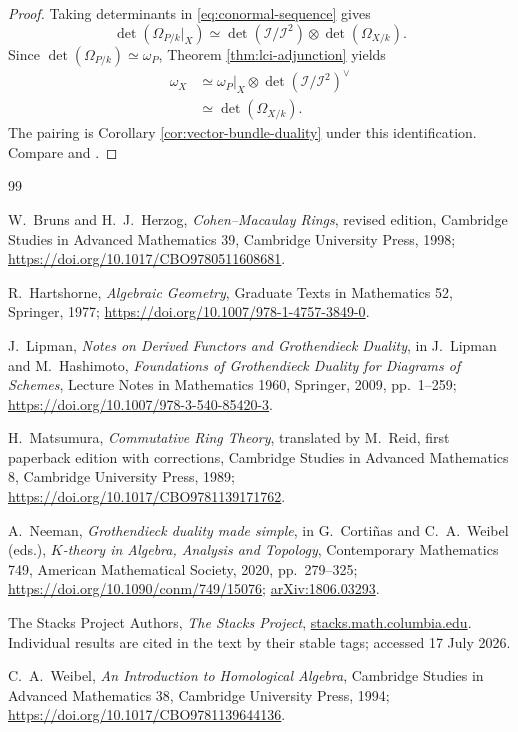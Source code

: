 \documentclass[11pt,a4paper]{article}
\theoremstyle{definition}
\theoremstyle{remark}
\newcommand{\II}{\mathcal I}
\newcommand{\dual}{^{\vee}}
\newcommand{\determinant}{\operatorname{det}}
\begin{document}
\begin{proof}
Taking determinants in \eqref{eq:conormal-sequence} gives
\[
  \determinant(\Omega_{P/k}|_X)
  \simeq
  \determinant(\II/\II^2)
  \otimes\determinant(\Omega_{X/k}).
\]
Since $\determinant(\Omega_{P/k})\simeq\omega_P$, Theorem
\ref{thm:lci-adjunction} yields
\begin{align*}
  \omega_X
  &\simeq
  \omega_P|_X\otimes\determinant(\II/\II^2)\dual\\
  &\simeq\determinant(\Omega_{X/k}).
\end{align*}
The pairing is Corollary \ref{cor:vector-bundle-duality} under this
identification.  Compare
\cite[Chapter III, Corollary 7.12]{HartshorneAG} and
\cite[Tag 0FVV]{Stacks}.
\end{proof}


\begin{thebibliography}{99}

W.~Bruns and H.~J.~Herzog,
\emph{Cohen--Macaulay Rings}, revised edition,
Cambridge Studies in Advanced Mathematics 39,
Cambridge University Press, 1998;
\url{https://doi.org/10.1017/CBO9780511608681}.

R.~Hartshorne,
\emph{Algebraic Geometry},
Graduate Texts in Mathematics 52,
Springer, 1977;
\url{https://doi.org/10.1007/978-1-4757-3849-0}.

J.~Lipman,
\emph{Notes on Derived Functors and Grothendieck Duality},
in J.~Lipman and M.~Hashimoto,
\emph{Foundations of Grothendieck Duality for Diagrams of Schemes},
Lecture Notes in Mathematics 1960,
Springer, 2009, pp.~1--259;
\url{https://doi.org/10.1007/978-3-540-85420-3}.

H.~Matsumura,
\emph{Commutative Ring Theory}, translated by M.~Reid, first paperback edition with corrections,
Cambridge Studies in Advanced Mathematics 8,
Cambridge University Press, 1989;
\url{https://doi.org/10.1017/CBO9781139171762}.

A.~Neeman,
\emph{Grothendieck duality made simple},
in G.~Corti\~nas and C.~A.~Weibel (eds.),
\emph{$K$-theory in Algebra, Analysis and Topology},
Contemporary Mathematics 749,
American Mathematical Society, 2020, pp.~279--325;
\url{https://doi.org/10.1090/conm/749/15076};
\href{https://arxiv.org/abs/1806.03293}{arXiv:1806.03293}.

The Stacks Project Authors,
\emph{The Stacks Project},
\href{https://stacks.math.columbia.edu/}{stacks.math.columbia.edu}.
Individual results are cited in the text by their stable tags; accessed
17 July 2026.

C.~A.~Weibel,
\emph{An Introduction to Homological Algebra},
Cambridge Studies in Advanced Mathematics 38,
Cambridge University Press, 1994;
\url{https://doi.org/10.1017/CBO9781139644136}.

\end{thebibliography}
\end{document}
